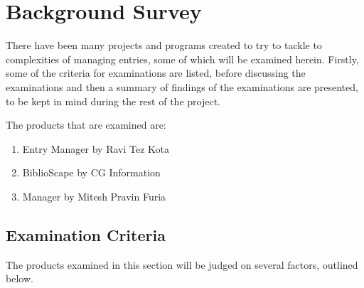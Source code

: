 \chapter{Background Survey}
\label{backgrnd}
There have been many projects and programs created to try to tackle to complexities of managing \bibtex{} entries, some of which will be examined herein.  Firstly, some of the criteria for examinations are listed, before discussing the examinations and then a summary of findings of the examinations are presented, to be kept in mind during the rest of the project.

The products that are examined are:
\begin{enumerate}
	\item \bibtex{} Entry Manager by Ravi Tez Kota
	\item BiblioScape by CG Information
	\item \bibtex{} Manager by Mitesh Pravin Furia 
\end{enumerate}

\section{Examination Criteria}
The products examined in this section will be judged on several factors, outlined below.


